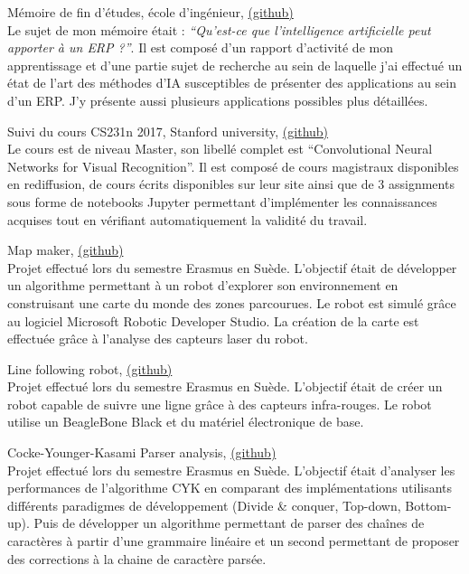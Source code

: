 {\large Mémoire de fin d'études, école d'ingénieur, \href{https://github.com/ThomasRanvier/memoire}{(github)}}
\\
{\small Le sujet de mon mémoire était : \textit{``Qu’est-ce que l’intelligence artificielle peut apporter à un ERP ?''}.
Il est composé d'un rapport d'activité de mon apprentissage et d'une partie sujet de recherche au sein de laquelle j'ai effectué un état de l'art des méthodes d'IA susceptibles de présenter des applications au sein d'un ERP.
J'y présente aussi plusieurs applications possibles plus détaillées.}

\medskip

{\large Suivi du cours CS231n 2017, Stanford university, \href{https://github.com/ThomasRanvier/stanford-cs231n}{(github)}}
\\
{\small Le cours est de niveau Master, son libell\'e complet est ``Convolutional Neural Networks for Visual Recognition''.
Il est compos\'e de cours magistraux disponibles en rediffusion, de cours \'ecrits disponibles sur leur site ainsi que de 3 assignments sous forme de notebooks Jupyter permettant d'impl\'ementer les connaissances acquises tout en v\'erifiant automatiquement la validit\'e du travail.}

\medskip
    
{\large Map maker, \href{https://github.com/ThomasRanvier/map_maker}{(github)}}
\\
{\small Projet effectu\'e lors du semestre Erasmus en Su\`ede. 
L'objectif \'etait de d\'evelopper un algorithme permettant \`a un robot d'explorer son environnement en construisant une carte du monde des zones parcourues.
Le robot est simul\'e gr\^ace au logiciel Microsoft Robotic Developer Studio.
La cr\'eation de la carte est effectu\'ee gr\^ace \`a l'analyse des capteurs laser du robot.}

\medskip
    
{\large Line following robot, \href{https://github.com/ThomasRanvier/line_following_robot}{(github)}}
\\
{\small Projet effectu\'e lors du semestre Erasmus en Su\`ede. 
L'objectif \'etait de cr\'eer un robot capable de suivre une ligne gr\^ace \`a des capteurs infra-rouges.
Le robot utilise un BeagleBone Black et du mat\'eriel \'electronique de base.}

\medskip

{\large Cocke-Younger-Kasami Parser analysis, \href{https://github.com/ThomasRanvier/cyk_algorithm_analysis}{(github)}}
\\
{\small Projet effectu\'e lors du semestre Erasmus en Su\`ede. 
L'objectif \'etait d'analyser les performances de l'algorithme CYK en comparant des impl\'ementations utilisants diff\'erents paradigmes de d\'eveloppement (Divide \& conquer, Top-down, Bottom-up).
Puis de d\'evelopper un algorithme permettant de parser des cha\^ines de caract\`eres \`a partir d'une grammaire lin\'eaire et un second permettant de proposer des corrections \`a la chaine de caract\`ere pars\'ee.}

